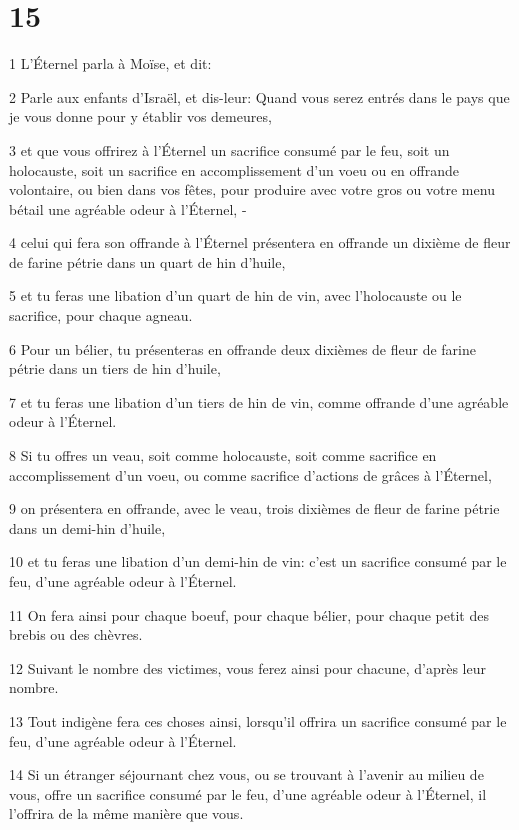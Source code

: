 \chapter{15}

\par 1 L'Éternel parla à Moïse, et dit:
\par 2 Parle aux enfants d'Israël, et dis-leur: Quand vous serez entrés dans le pays que je vous donne pour y établir vos demeures,
\par 3 et que vous offrirez à l'Éternel un sacrifice consumé par le feu, soit un holocauste, soit un sacrifice en accomplissement d'un voeu ou en offrande volontaire, ou bien dans vos fêtes, pour produire avec votre gros ou votre menu bétail une agréable odeur à l'Éternel, -
\par 4 celui qui fera son offrande à l'Éternel présentera en offrande un dixième de fleur de farine pétrie dans un quart de hin d'huile,
\par 5 et tu feras une libation d'un quart de hin de vin, avec l'holocauste ou le sacrifice, pour chaque agneau.
\par 6 Pour un bélier, tu présenteras en offrande deux dixièmes de fleur de farine pétrie dans un tiers de hin d'huile,
\par 7 et tu feras une libation d'un tiers de hin de vin, comme offrande d'une agréable odeur à l'Éternel.
\par 8 Si tu offres un veau, soit comme holocauste, soit comme sacrifice en accomplissement d'un voeu, ou comme sacrifice d'actions de grâces à l'Éternel,
\par 9 on présentera en offrande, avec le veau, trois dixièmes de fleur de farine pétrie dans un demi-hin d'huile,
\par 10 et tu feras une libation d'un demi-hin de vin: c'est un sacrifice consumé par le feu, d'une agréable odeur à l'Éternel.
\par 11 On fera ainsi pour chaque boeuf, pour chaque bélier, pour chaque petit des brebis ou des chèvres.
\par 12 Suivant le nombre des victimes, vous ferez ainsi pour chacune, d'après leur nombre.
\par 13 Tout indigène fera ces choses ainsi, lorsqu'il offrira un sacrifice consumé par le feu, d'une agréable odeur à l'Éternel.
\par 14 Si un étranger séjournant chez vous, ou se trouvant à l'avenir au milieu de vous, offre un sacrifice consumé par le feu, d'une agréable odeur à l'Éternel, il l'offrira de la même manière que vous.

